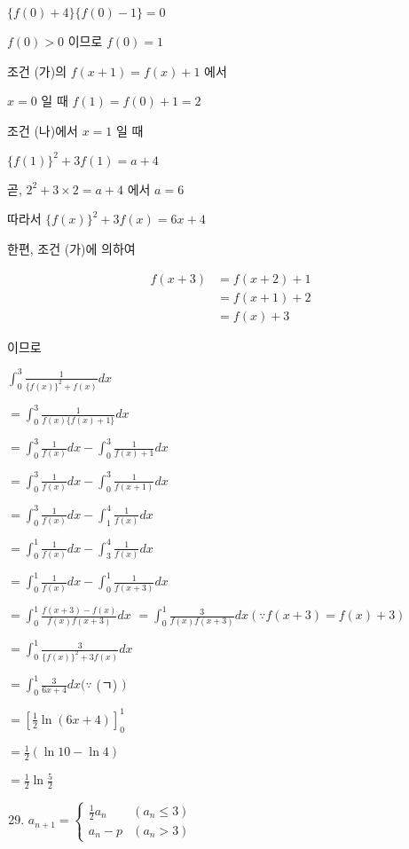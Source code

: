 \documentclass[10pt]{article}
\begin{document}
\(\{f(0)+4\}\{f(0)-1\}=0\)

\(f(0)>0\) 이므로 \(f(0)=1\)

조건 (가)의 \(f(x+1)=f(x)+1\) 에서

\(x=0\) 일 때 \(f(1)=f(0)+1=2\)

조건 (나)에서 \(x=1\) 일 때

\(\{f(1)\}^{2}+3 f(1)=a+4\)

곧, \(2^{2}+3 \times 2=a+4\) 에서 \(a=6\)

따라서 \(\{f(x)\}^{2}+3 f(x)=6 x+4\)

한편, 조건 (가)에 의하여

\[
\begin{aligned}
f(x+3) & =f(x+2)+1 \\
& =f(x+1)+2 \\
& =f(x)+3
\end{aligned}
\]

이므로

\(\int_{0}^{3} \frac{1}{\{f(x)\}^{2}+f(x)} d x\)

\(=\int_{0}^{3} \frac{1}{f(x)\{f(x)+1\}} d x\)

\(=\int_{0}^{3} \frac{1}{f(x)} d x-\int_{0}^{3} \frac{1}{f(x)+1} d x\)

\(=\int_{0}^{3} \frac{1}{f(x)} d x-\int_{0}^{3} \frac{1}{f(x+1)} d x\)

\(=\int_{0}^{3} \frac{1}{f(x)} d x-\int_{1}^{4} \frac{1}{f(x)} d x\)

\(=\int_{0}^{1} \frac{1}{f(x)} d x-\int_{3}^{4} \frac{1}{f(x)} d x\)

\(=\int_{0}^{1} \frac{1}{f(x)} d x-\int_{0}^{1} \frac{1}{f(x+3)} d x\)

\(=\int_{0}^{1} \frac{f(x+3)-f(x)}{f(x) f(x+3)} d x\) \(=\int_{0}^{1} \frac{3}{f(x) f(x+3)} d x(\because f(x+3)=f(x)+3)\)

\(=\int_{0}^{1} \frac{3}{\{f(x)\}^{2}+3 f(x)} d x\)

\(=\int_{0}^{1} \frac{3}{6 x+4} d x(\because\) (ㄱ) \()\)

\(=\left[\frac{1}{2} \ln (6 x+4)\right]_{0}^{1}\)

\(=\frac{1}{2}(\ln 10-\ln 4)\)

\(=\frac{1}{2} \ln \frac{5}{2}\)

\begin{enumerate}
  \setcounter{enumi}{28}
  \item \(a_{n+1}= \begin{cases}\frac{1}{2} a_{n} & \left(a_{n} \leq 3\right) \\ a_{n}-p & \left(a_{n}>3\right)\end{cases}\)
\end{enumerate}
\end{document}
